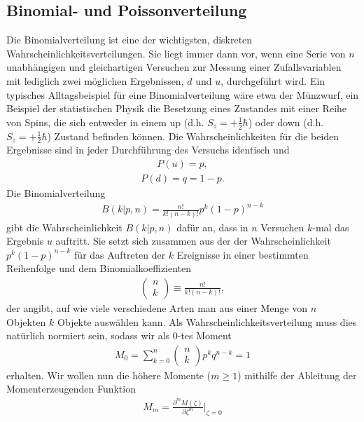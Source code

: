 \subsection{Binomial- und Poissonverteilung}
Die Binomialverteilung ist eine der wichtigsten, diskreten Wahrscheinlichkeitsverteilungen. Sie liegt immer dann vor, wenn eine Serie von $n$ unabhängigen und gleichartigen Versuchen zur Messung einer Zufallsvariablen mit lediglich zwei möglichen Ergebnissen, $d$ und $u$, durchgeführt wird. Ein typisches Alltagsbeispiel für eine Binomialverteilung wäre etwa der Münzwurf, ein Beispiel der statistischen Physik die Besetzung eines Zustandes mit einer Reihe von Spins, die sich entweder in einem \glqq up\grqq{} (d.h. $S_z = +\frac{1}{2}\hbar$) oder \glqq down\grqq{} (d.h. $S_z = +\frac{1}{2}\hbar$) Zustand befinden können. Die Wahrscheinlichkeiten für die beiden Ergebnisse sind in jeder Durchführung des Versuchs identisch und  
\begin{align}
P(u) = p,
\end{align}
\begin{align}
P(d) = q = 1-p.
\end{align}
Die Binomialverteilung 
\begin{align}
B(k|p, n) = \frac{ n! }{ k! (n - k)! }p^k (1-p)^{n-k}
\end{align}
gibt die Wahrscheinlichkeit $B(k|p, n)$ dafür an, dass in $n$ Versuchen $k$-mal das Ergebnis $u$ auftritt. Sie setzt sich zusammen aus der der Wahrscheinlichkeit $p^k (1-p)^{n-k}$ für das Auftreten der $k$ Ereignisse in einer bestimmten Reihenfolge und dem Binomialkoeffizienten
\begin{align}
\begin{pmatrix} n\\ k \end{pmatrix} \equiv \frac{ n! }{ k! (n - k)! },
\end{align}
der angibt, auf wie viele verschiedene Arten man aus einer Menge von $n$ Objekten $k$ Objekte auswählen kann. Als Wahrscheinlichkeitsverteilung muss dies natürlich normiert sein, sodass wir als 0-tes Moment 
\begin{align}
M_0 = \sum_{k = 0}^n \begin{pmatrix} n\\ k \end{pmatrix} p^k q^{n-k} = 1
\end{align}
erhalten.  Wir wollen nun die höhere Momente ($m \geq 1$) mithilfe der Ableitung der Momenterzeugenden Funktion
\begin{align}
M_m = \frac{ \partial^m M (\zeta) }{ \partial \zeta^m} \bigg|_{\zeta = 0}
\end{align}
